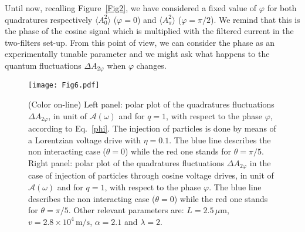 \documentclass[12pt]{iopart}
\begin{document}
Until now, recalling Figure~\ref{Fig2}, we have considered a fixed value of $\varphi$ for both quadratures respectively $\langle A_{0}^2 \rangle$ ($\varphi=0$) and $\langle A_{\pi}^2 \rangle$ ($\varphi=\pi/2$). We remind that this is the phase of the cosine signal which is multiplied with the filtered current in the two-filters set-up. From this point of view, we can consider the phase as an experimentally tunable parameter and we might ask what happens to the quantum fluctuations $\Delta A_{2\varphi}$ when $\varphi$ changes.\\
\begin{figure}[ht]
\centering
\texttt{[image: Fig6.pdf]}
\caption{(Color on-line) Left panel: polar plot of the quadratures fluctuations $\Delta A_{2\varphi}$, in unit of $\mathcal{A}(\omega)$ and for $q=1$, with respect to the phase $\varphi$, according to Eq.~\eqref{phi}. The injection of particles is done by means of a Lorentzian voltage drive with $\eta=0.1$. The blue line describes the non interacting case ($\theta=0$) while the red one stands for $\theta=\pi/5$. Right panel: polar plot of the quadratures fluctuations $\Delta A_{2\varphi}$ in the case of injection of particles through cosine voltage drives, in unit of $\mathcal{A}(\omega)$ and for $q=1$, with respect to the phase $\varphi$. The blue line describes the non interacting case ($\theta=0$) while the red one stands for $\theta=\pi/5$. Other relevant parameters are: $L=2.5\, \mu\mathrm{m}$, $v=2.8\times 10^4\, \mathrm{m/s}$, $\alpha=2.1$ and $\lambda=2$.} 
\label{Fig6}
\end{figure} 
\end{document}
